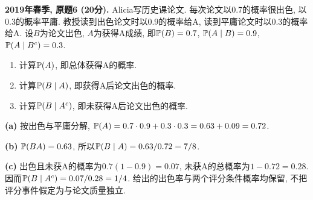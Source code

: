 \begin{exercise}\label{ex:m1-2019s-q6}
\textbf{2019年春季, 原题6 (20分).} Alicia写历史课论文. 每次论文以0.7的概率很出色, 以0.3的概率平庸. 教授读到出色论文时以0.9的概率给A, 读到平庸论文时以0.3的概率给A. 设$B$为论文出色, $A$为获得A成绩, 即$\mathbb P(B)=0.7$, $\mathbb P(A\mid B)=0.9$, $\mathbb P(A\mid B^c)=0.3$.
\begin{enumerate}\item[(a)]\label{ex:m1-2019s-q6-a} 计算$\mathbb P(A)$, 即总体获得A的概率.\item[(b)]\label{ex:m1-2019s-q6-b} 计算$\mathbb P(B\mid A)$, 即获得A后论文出色的概率.\item[(c)]\label{ex:m1-2019s-q6-c} 计算$\mathbb P(B\mid A^c)$, 即未获得A后论文出色的概率.\end{enumerate}
\end{exercise}
\begin{solution}
\textbf{(a)}\label{sol:m1-2019s-q6-a} 按出色与平庸分解, $\mathbb P(A)=0.7\cdot0.9+0.3\cdot0.3=0.63+0.09=0.72$.

\textbf{(b)}\label{sol:m1-2019s-q6-b} $\mathbb P(BA)=0.63$, 所以$\mathbb P(B\mid A)=0.63/0.72=7/8$.

\textbf{(c)}\label{sol:m1-2019s-q6-c} 出色且未获A的概率为$0.7(1-0.9)=0.07$, 未获A的总概率为$1-0.72=0.28$. 因而$\mathbb P(B\mid A^c)=0.07/0.28=1/4$. 给出的出色率与两个评分条件概率均保留, 不把评分事件假定为与论文质量独立.
\end{solution}

